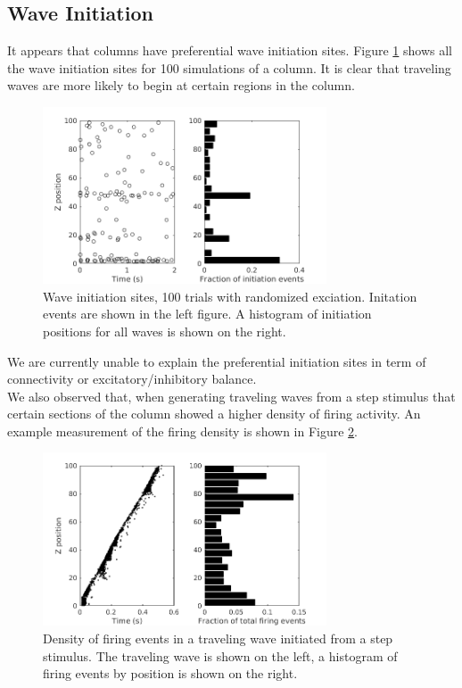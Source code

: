 \documentclass[a4paper,11pt]{article}
\begin{document}
\subsection{Wave Initiation}
It appears that columns have preferential wave initiation sites.
Figure \ref{fig:wave_initiation} shows all the wave initiation sites for 100 simulations of a column.
It is clear that traveling waves are more likely to begin at certain regions in the column.
\begin{figure}[!htb]
 \caption{Wave initiation sites, 100 trials with randomized exciation. Initation events are shown in the left figure. A histogram of initiation positions for all waves is shown on the right.}
 \label{fig:wave_initiation}
 \centering
   \includegraphics[width=0.75\textwidth]{fig/InitiationSites_100sims}
\end{figure}
We are currently unable to explain the preferential initiation sites in term of connectivity or excitatory/inhibitory balance. 
\\
We also observed that, when generating traveling waves from a step stimulus that certain sections of the column showed a higher density of firing activity.
An example measurement of the firing density is shown in Figure \ref{fig:wave_density}.
\begin{figure}[!htb]
 \caption{Density of firing events in a traveling wave initiated from a step stimulus. The traveling wave is shown on the left, a histogram of firing events by position is shown on the right.}
 \label{fig:wave_density}
 \centering
   \includegraphics[width=0.75\textwidth]{fig/ImpulseWaveDensity}
\end{figure}
\end{document}
